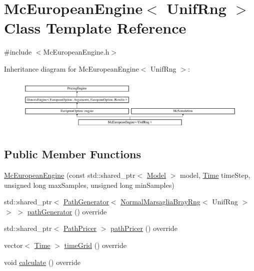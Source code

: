 \hypertarget{class_mc_european_engine}{}\section{Mc\+European\+Engine$<$ Unif\+Rng $>$ Class Template Reference}
\label{class_mc_european_engine}


{\ttfamily \#include $<$Mc\+European\+Engine.\+h$>$}

Inheritance diagram for Mc\+European\+Engine$<$ Unif\+Rng $>$\+:\begin{figure}[H]
\begin{center}
\leavevmode
\includegraphics[height=2.586605cm]{class_mc_european_engine}
\end{center}
\end{figure}
\subsection*{Public Member Functions}
\begin{DoxyCompactItemize}
\item 
\hyperlink{class_mc_european_engine_ae43a5aacc327f15f33e63e3c505ec324}{Mc\+European\+Engine} (const std\+::shared\+\_\+ptr$<$ \hyperlink{class_model}{Model} $>$ model, \hyperlink{_name_def_8h_ac2d3e0ba793497bcca555c7c2cf64ff3}{Time} time\+Step, unsigned long max\+Samples, unsigned long min\+Samples)
\item 
std\+::shared\+\_\+ptr$<$ \hyperlink{class_path_generator}{Path\+Generator}$<$ \hyperlink{class_normal_marsaglia_bray_rng}{Normal\+Marsaglia\+Bray\+Rng}$<$ Unif\+Rng $>$ $>$ $>$ \hyperlink{class_mc_european_engine_ae2a93d63269eac42449f8b958ec15535}{path\+Generator} () override
\item 
std\+::shared\+\_\+ptr$<$ \hyperlink{class_path_pricer}{Path\+Pricer} $>$ \hyperlink{class_mc_european_engine_a21dd3ee9970dd5bae2be03a723d0a290}{path\+Pricer} () override
\item 
vector$<$ \hyperlink{_name_def_8h_ac2d3e0ba793497bcca555c7c2cf64ff3}{Time} $>$ \hyperlink{class_mc_european_engine_a76252919552e4061795e30f30947a1ee}{time\+Grid} () override
\item 
void \hyperlink{class_mc_european_engine_a51b2f0147fbaf2b84c65851bbc2baa7b}{calculate} () override
\end{DoxyCompactItemize}
